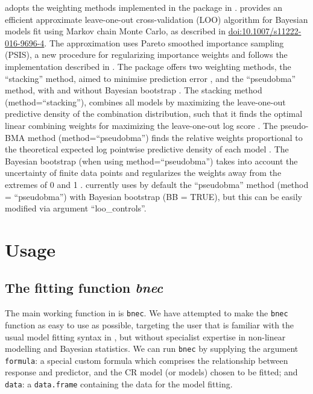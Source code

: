 \documentclass[
  shortnames]{jss}
\begin{document}
 adopts the weighting methods implemented in the  \citep{vehtari2020} package in .  provides an efficient approximate leave-one-out cross-validation (LOO) algorithm for Bayesian models fit using Markov chain Monte Carlo, as described in \citep{vehtari2017} \url{doi:10.1007/s11222-016-9696-4}. The approximation uses Pareto smoothed importance sampling (PSIS), a new procedure for regularizing importance weights and follows the implementation described in \citep{Vehtari2019}. The  package offers two weighting methods, the ``stacking'' method, aimed to minimise prediction error \citep{Yao2018}, and the ``pseudobma'' method, with and without Bayesian bootstrap \citep{vehtari2020, vehtari2017}. The stacking method (method=``stacking''), combines all models by maximizing the leave-one-out predictive density of the combination distribution, such that it finds the optimal linear combining weights for maximizing the leave-one-out log score \citep{vehtari2020}. The pseudo-BMA method (method=``pseudobma'') finds the relative weights proportional to the theoretical expected log pointwise predictive density of each model \citep{vehtari2020}. The Bayesian bootstrap (when using method=``pseudobma'') takes into account the uncertainty of finite data points and regularizes the weights away from the extremes of 0 and 1 \citep{vehtari2020}.  currently uses by default the ``pseudobma'' method (method = ``pseudobma'') with Bayesian bootstrap (BB = TRUE), but this can be easily modified via argument ``loo\_controls''.

\hypertarget{usage}{%
\section{Usage}\label{usage}}

\subsection[The fitting function bnec]{The fitting function \emph{bnec}}\label{ffbnec}

The main working function in  is \texttt{bnec}. We have attempted to make the \texttt{bnec} function as easy to use as possible, targeting the  user that is familiar with the usual model fitting syntax in , but without specialist expertise in non-linear modelling and Bayesian statistics. We can run \texttt{bnec} by supplying the argument \texttt{formula}: a special custom formula which comprises the relationship between response and predictor, and the CR model (or models) chosen to be fitted; and \texttt{data}: a \texttt{data.frame} containing the data for the model fitting.
\end{document}
